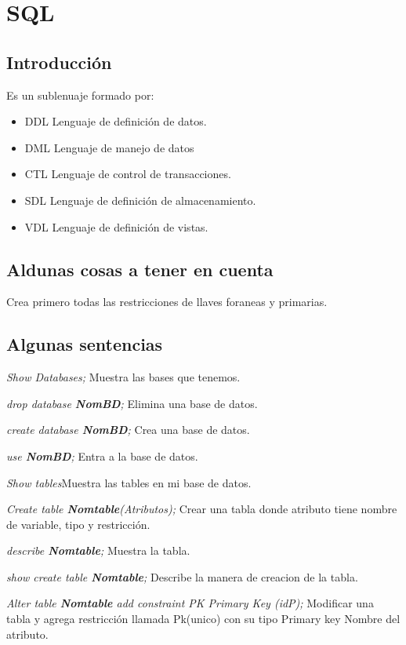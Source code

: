 \documentclass[12pt, fleqn]{report}                             %
\theoremstyle{break}                                            %
\begin{document}
\chapter{SQL}
	\section{Introducción}
	Es un sublenuaje formado por:
	\begin{itemize}
		\item DDL Lenguaje de definición de datos.
		\item DML Lenguaje de manejo de datos
		\item CTL Lenguaje de control de transacciones.
		\item SDL Lenguaje de definición de almacenamiento.
		\item VDL Lenguaje de definición de vistas.
	\end{itemize}
    \section{Aldunas cosas a tener en cuenta}
    Crea primero todas las restricciones de llaves foraneas y primarias.
    
	\section{Algunas sentencias}

	\emph{Show Databases;} Muestra las bases que tenemos.


	\emph{drop database \textbf{NomBD};} Elimina una base de datos.

	\emph{create database \textbf{NomBD};} Crea una base de datos.

	\emph{use \textbf{NomBD};} Entra a la base de datos.

	\emph{Show tables}Muestra las tables en mi base de datos.
 
	\emph{Create table \textbf{Nomtable}(Atributos);} Crear una tabla donde atributo tiene nombre de variable, tipo y restricción.

	\emph{describe \textbf{Nomtable};} Muestra la tabla.

	\emph{show create table \textbf{Nomtable};} Describe la manera de creacion de la tabla.

	\emph{Alter table \textbf{Nomtable} add constraint PK Primary Key (idP);} Modificar una tabla y agrega restricción llamada Pk(unico) con su tipo Primary key Nombre del atributo.
\end{document}
